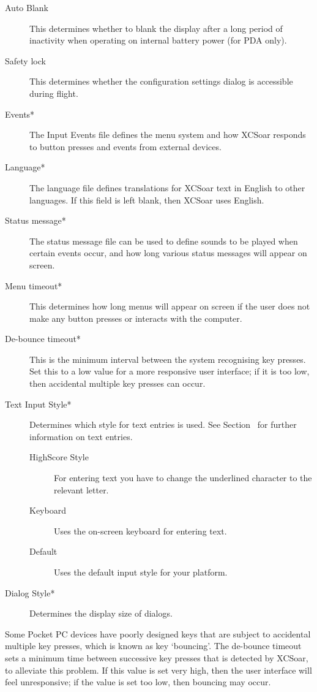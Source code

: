 \documentclass[a4paper,12pt]{refrep}
\begin{document}
\begin{description}
\item[Auto Blank] This determines whether to blank the display after a long period of inactivity when operating on internal battery power (for PDA only).
\item[Safety lock]
This determines whether the configuration settings dialog is
accessible during flight.
\item[Events*]
The Input Events file defines the menu system and how XCSoar responds
to button presses and events from external devices.
\item[Language*]
The language file defines translations for XCSoar text in English to
other languages.  If this field is left blank, then XCSoar uses
English.
\item[Status message*]
The status message file can be used to define sounds to be played when certain
events occur, and how long various status messages will appear on screen.
\item[Menu timeout*]
This determines how long menus will appear on screen if the user
does not make any button presses or interacts with the computer.
\item[De-bounce timeout*]
This is the minimum interval between the system recognising key presses. 
Set this to a low value for a more responsive user interface; if
it is too low, then accidental multiple key presses can occur.
\item[Text Input Style*] Determines which style for text entries is used. See Section~ for further information on text entries.
\begin{description}
\item[HighScore Style] For entering text you have to change the underlined character to the relevant letter.
\item[Keyboard] Uses the on-screen keyboard for entering text.
\item[Default] Uses the default input style for your platform.
\end{description}
\item[Dialog Style*] Determines the display size of dialogs.
\end{description}

Some Pocket PC devices have poorly designed keys that are subject to
accidental multiple key presses, which is known as key `bouncing'.  The
de-bounce timeout sets a minimum time between successive key presses
that is detected by XCSoar, to alleviate this problem.  If this value
is set very high, then the user interface will feel unresponsive; if
the value is set too low, then bouncing may occur.
\end{document}
